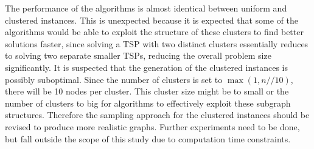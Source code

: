 The performance of the algorithms is almost identical between uniform and clustered instances.
This is unexpected because it is expected that some of the algorithms would be able to exploit the structure of these clusters to find better solutions faster, since solving a TSP with two distinct clusters essentially reduces to solving two separate smaller TSPs, reducing the overall problem size significantly.
It is suspected that the generation of the clustered instances is possibly suboptimal.
Since the number of clusters is set to \( \max(1, n  // 10) \), there will be 10 nodes per cluster. This cluster size might be to small or the number of clusters to big for algorithms to effectively exploit these subgraph structures.
Therefore the sampling  approach for the clustered instances should be revised to produce more realistic graphs. Further experiments need to be done, but fall outside the scope of this study due to computation time constraints.



